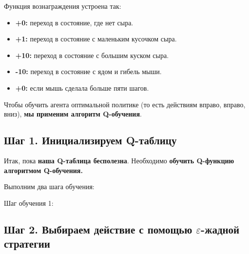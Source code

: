 \documentclass[11pt,a4paper]{article}
\begin{document}

Функция вознаграждения устроена так:

\begin{itemize}
\tightlist
\item
  \textbf{+0:} переход в состояние, где нет сыра.
\item
  \textbf{+1:} переход в состояние с маленьким кусочком сыра.
\item
  \textbf{+10:} переход в состояние с большим куском сыра.
\item
  \textbf{-10:} переход в состояние с ядом и гибель мыши.
\item
  \textbf{+0:} если мышь сделала больше пяти шагов.
\end{itemize}


Чтобы обучить агента оптимальной политике (то есть действиям вправо, вправо, вниз), \textbf{мы применим алгоритм Q-обучения}.

\subsection{Шаг 1. Инициализируем Q-таблицу}\label{step-1-initialize-the-q-table}


Итак, пока \textbf{наша Q-таблица бесполезна}. Необходимо \textbf{обучить Q-функцию алгоритмом Q-обучения.}

Выполним два шага обучения:

Шаг обучения 1:

\subsection{\texorpdfstring{Шаг 2. Выбираем действие с помощью \(\varepsilon\)-жадной стратегии}{Шаг 2. Выбираем действие с помощью epsilon-жадной стратегии}}\label{step-2-choose-an-action-using-the-epsilon-greedy-strategy-1}
\end{document}
